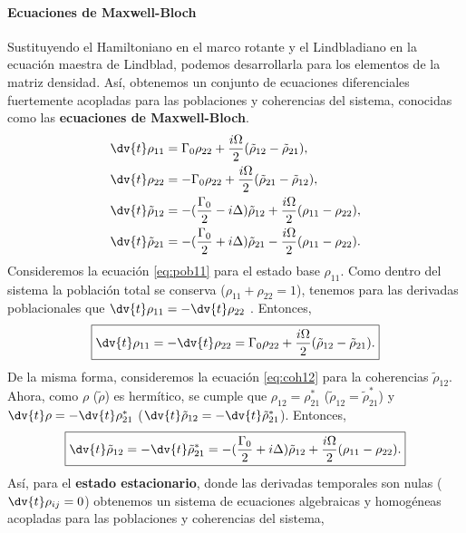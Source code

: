 \paragraph{Ecuaciones de Maxwell-Bloch}
Sustituyendo el Hamiltoniano en el marco rotante y el Lindbladiano en la ecuación maestra de Lindblad, podemos desarrollarla para los elementos de la matriz densidad. Así, obtenemos un conjunto de ecuaciones diferenciales fuertemente acopladas para las poblaciones y coherencias del sistema, conocidas como las \textbf{ecuaciones de Maxwell-Bloch}.
\begin{subequations}
\begin{align}
    \dv{t} \rho_{11} &= \Gamma_0 \rho_{22} + \frac{i \Omega}{2}(\tilde{\rho}_{12}  - \tilde{\rho}_{21}), \label{eq:pob11} \\
    \dv{t} \rho_{22} &= -\Gamma_0 \rho_{22} + \frac{i \Omega}{2}(\tilde{\rho}_{21}  - \tilde{\rho}_{12}), \label{eq:pob22} \\
    \dv{t} \tilde{\rho}_{12} &= -(\frac{\Gamma_0}{2}-i\Delta) \tilde{\rho}_{12} + \frac{i \Omega}{2}(\rho_{11} - \rho_{22}), \label{eq:coh12}\\
    \dv{t} \tilde{\rho}_{21} &= -(\frac{\Gamma_0}{2}+i\Delta) \tilde{\rho}_{21} - \frac{i\Omega}{2}(\rho_{11} - \rho_{22}). \label{eq:coh21}
\end{align}
\end{subequations}
Consideremos la ecuación \eqref{eq:pob11} para el estado base $\rho_{11}$. Como dentro del sistema la población total se conserva ($\rho_{11} + \rho_{22} = 1$), tenemos para las derivadas poblacionales que $\dv{t} \rho_{11} = - \dv{t} \rho_{22}$ . Entonces,
\begin{equation}
\boxed{
    \dv{t} \rho_{11} = - \dv{t} \rho_{22} = \Gamma_0 \rho_{22} + \frac{i \Omega}{2}(\tilde{\rho}_{12} - \tilde{\rho}_{21}).
}
\end{equation}
De la misma forma, consideremos la ecuación \eqref{eq:coh12} para la coherencias $\tilde{\rho}_{12}$. Ahora, como $\rho$ ($\tilde{\rho}$) es hermítico, se cumple que  $\rho_{12} = \rho_{21}^{*}$ ($\tilde{\rho}_{12} = \tilde{\rho}_{21}^{*}$) y $\dv{t} \rho = - \dv{t} \rho_{21}^*$ ($\dv{t} \tilde{\rho}_{12} = -\dv{t} \tilde{\rho}_{21}^{*}$). Entonces,
\begin{equation}
\boxed{
    \dv{t} \tilde{\rho}_{12} = - \dv{t} \tilde{\rho}_{21}^{*} = -(\frac{\Gamma_0}{2} + i \Delta) \tilde{\rho}_{12} + \frac{i \Omega}{2}(\rho_{11} - \rho_{22}).
}
\end{equation}
Así, para el \textbf{estado estacionario}, donde las derivadas temporales son nulas ($\dv{t} \rho_{ij} = 0$) obtenemos un sistema de ecuaciones algebraicas y homogéneas acopladas para las poblaciones y coherencias del sistema,

